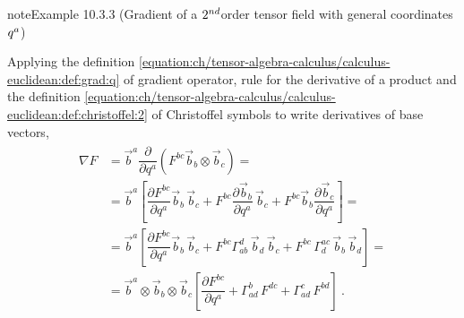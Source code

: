 \documentclass[letterpaper,10pt,english]{jupyterBook}
\begin{document}
\begin{sphinxadmonition}{note}{Example 10.3.3 (Gradient of a \protect\(2^{nd}\protect\)\sphinxhyphen{}order tensor field \sphinxhyphen{} with general coordinates \protect\(q^{a}\protect\))}



\sphinxAtStartPar
Applying the definition \eqref{equation:ch/tensor-algebra-calculus/calculus-euclidean:def:grad:q} of gradient operator, rule for the derivative of a product and the definition \eqref{equation:ch/tensor-algebra-calculus/calculus-euclidean:def:christoffel:2} of Christoffel symbols to write derivatives of base vectors,
\begin{equation*}
\begin{split}\begin{aligned}
  \nabla F 
  & = \vec{b}^a \dfrac{\partial}{\partial q^a} \left( F^{bc} \vec{b}_b \otimes \vec{b}_c \right) = \\
  & = \vec{b}^a \left[ \dfrac{\partial F^{bc}}{\partial q^a} \vec{b}_b \, \vec{b}_c + F^{bc} \dfrac{\partial \vec{b}_b}{\partial q^a} \, \vec{b}_c + F^{bc} \vec{b}_b \dfrac{\partial \vec{b}_c}{\partial q^a} \right] = \\
  & = \vec{b}^a \left[ \dfrac{\partial F^{bc}}{\partial q^a} \vec{b}_b \, \vec{b}_c + F^{bc} \Gamma_{ab}^d \, \vec{b}_d \, \vec{b}_c + F^{bc} \, \Gamma_{d}^{ac} \, \vec{b}_b \, \vec{b}_d \right] = \\
  & = \vec{b}^a \otimes \vec{b}_b \otimes \vec{b}_c \left[ \dfrac{\partial F^{bc}}{\partial q^a} + \Gamma_{ad}^b \, F^{dc} + \Gamma^{c}_{ad} \, F^{bd}  \right] \ .
\end{aligned}\end{split}
\end{equation*}\end{sphinxadmonition}
\end{document}
